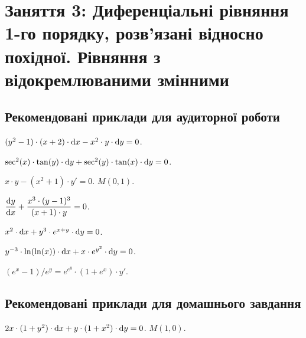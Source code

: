 \section*{Заняття 3: Диференціальні рівняння 1-го порядку, розв'язані відносно похідної. Рівняння з відокремлюваними змінними}

\subsection*{Рекомендовані приклади для аудиторної роботи}

\begin{problem}
	$(y^2 - 1) \cdot (x + 2) \cdot \mathop{}\!\mathrm{d} x - x^2 \cdot y \cdot \mathop{}\!\mathrm{d} y = 0$.
\end{problem}

\begin{problem}
	$\sec^2 (x) \cdot \tan (y) \cdot \mathop{}\!\mathrm{d} y + \sec^2 (y) \cdot \tan (x) \cdot \mathop{}\!\mathrm{d} y = 0$.
\end{problem}

\begin{problem}
	$x \cdot y - (x^2 + 1) \cdot y' = 0$.  $M(0,1)$.
\end{problem}

\begin{problem}
	$\dfrac{\mathop{}\!\mathrm{d} y}{\mathop{}\!\mathrm{d} x} + \dfrac{x^3 \cdot (y - 1)^3}{(x + 1) \cdot y} = 0$.
\end{problem}

\begin{problem}
	$x^2 \cdot \mathop{}\!\mathrm{d} x + y^3 \cdot e^{x + y} \cdot \mathop{}\!\mathrm{d} y = 0$.
\end{problem}

\begin{problem}
	$y^{-3} \cdot \ln (\ln (x)) \cdot \mathop{}\!\mathrm{d} x + x \cdot e^{y^2} \cdot \mathop{}\!\mathrm{d} y = 0$.
\end{problem}

\begin{problem}
	$(e^x - 1) / e^y = e^{e^y} \cdot (1 + e^x) \cdot y'$.
\end{problem}

\subsection*{Рекомендовані приклади для домашнього завдання}

\begin{problem}
	$2 x \cdot (1 + y^2) \cdot \mathop{}\!\mathrm{d} x + y \cdot (1 + x^2) \cdot \mathop{}\!\mathrm{d} y = 0$.  $M(1,0)$.
\end{problem}

